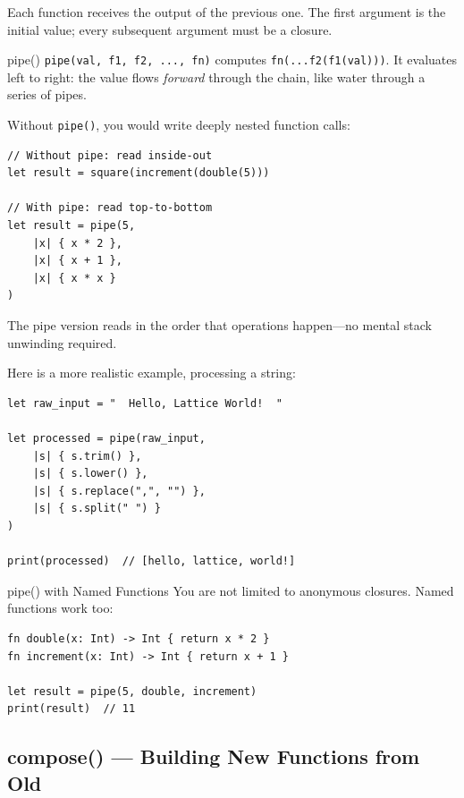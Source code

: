 Each function receives the output of the previous one.
The first argument is the initial value; every subsequent argument must be a closure.

\begin{defnbox}{pipe()}
\lstinline|pipe(val, f1, f2, ..., fn)| computes \lstinline|fn(...f2(f1(val)))|.
It evaluates left to right: the value flows \emph{forward} through the chain, like water through a series of pipes.
\end{defnbox}

Without \lstinline|pipe()|, you would write deeply nested function calls:

\begin{lstlisting}[language=Lattice, caption={Nested calls vs.\ pipe}]
// Without pipe: read inside-out
let result = square(increment(double(5)))

// With pipe: read top-to-bottom
let result = pipe(5,
    |x| { x * 2 },
    |x| { x + 1 },
    |x| { x * x }
)
\end{lstlisting}

The pipe version reads in the order that operations happen---no mental stack unwinding required.

Here is a more realistic example, processing a string:

\begin{lstlisting}[language=Lattice, caption={String processing with pipe}]
let raw_input = "  Hello, Lattice World!  "

let processed = pipe(raw_input,
    |s| { s.trim() },
    |s| { s.lower() },
    |s| { s.replace(",", "") },
    |s| { s.split(" ") }
)

print(processed)  // [hello, lattice, world!]
\end{lstlisting}

\begin{tipbox}{pipe() with Named Functions}
You are not limited to anonymous closures.
Named functions work too:
\begin{lstlisting}[language=Lattice]
fn double(x: Int) -> Int { return x * 2 }
fn increment(x: Int) -> Int { return x + 1 }

let result = pipe(5, double, increment)
print(result)  // 11
\end{lstlisting}
\end{tipbox}

\subsection{compose() --- Building New Functions from Old}\label{subsec:compose}

